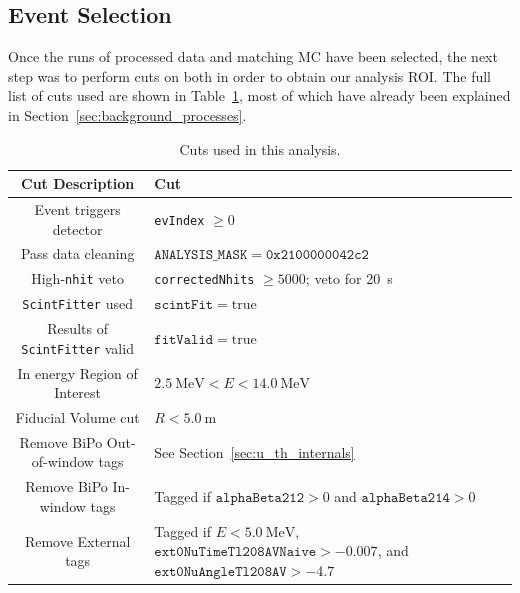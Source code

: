 \subsection{Event Selection}\label{sec:event_selection}
Once the runs of processed data and matching MC have been selected, the next step was to perform cuts on both in order to obtain our analysis ROI. The full list of cuts used are shown in Table~\ref{tab:ev_selection}, most of which have already been explained in Section~\ref{sec:background_processes}.

\begin{table}
    \centering
    \begin{tabular}{c >{\centering\arraybackslash}m{7.5 cm}}
        \hline
        Cut Description                        & Cut                      \\ \hline \hline
        Event triggers detector                & \texttt{evIndex} $\ge 0$ \\
        Pass data cleaning                     & $\mathtt{ANALYSIS\_MASK} = \mathtt{0x2100000042c2}$ \\
        High-\texttt{nhit} veto                & \texttt{correctedNhits} $\ge 5000$; veto for \SI{20}{s} \\
        \texttt{ScintFitter} used              & $\mathtt{scintFit} = \mathrm{true}$ \\
        Results of \texttt{ScintFitter} valid  & $\mathtt{fitValid} = \mathrm{true}$ \\
        In energy Region of Interest           & $\SI{2.5}{\MeV} < E < \SI{14.0}{\MeV}$ \\
        Fiducial Volume cut                    & $R < \SI{5.0}{\metre}$ \\
        Remove BiPo Out-of-window tags         & See Section~\ref{sec:u_th_internals} \\
        Remove BiPo In-window tags             & Tagged if $\mathtt{alphaBeta212} > 0$ and $\mathtt{alphaBeta214} > 0$ \\
        Remove External tags                   & Tagged if $E < \SI{5.0}{\MeV}$, $\mathtt{ext0NuTimeTl208AVNaive} > -0.007$, and $\mathtt{ext0NuAngleTl208AV} > -4.7$ \\
        \hline
    \end{tabular}
    \caption{Cuts used in this analysis.}
    \label{tab:ev_selection}
\end{table}

